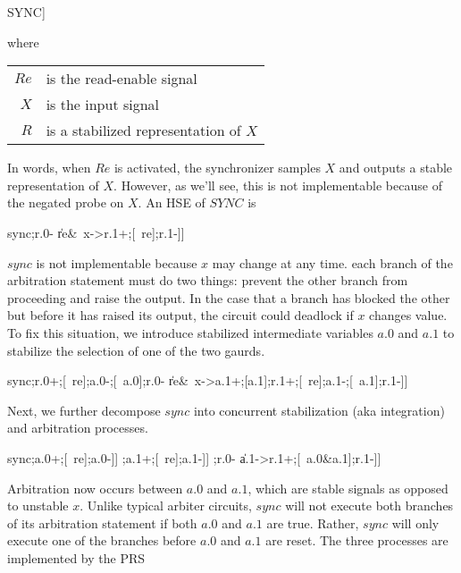 \documentclass[aer.tex]{subfiles}
\begin{document}
\begin{csp}
SYNC\equiv*[[#{Re}&#X->R;Re;R
          \|#{Re}&~#X->R;Re;R]]
\end{csp}

where

\begin{tabular}[c]{rl}
$Re$ & is the read-enable signal \\
$X$ & is the input signal \\
$R$ & is a stabilized representation of $X$ \\
\end{tabular}

In words, when $Re$ is activated, the synchronizer samples $X$ and outputs a stable representation of $X$.
However, as we'll see, this is not implementable because of the negated probe on $X$. 
An HSE of $SYNC$ is

\begin{hse}
sync\equiv*[[re&x->r.0+;[~re];r.0-
        \|re&~x->r.1+;[~re];r.1-]]
\end{hse}

$sync$ is not implementable because $x$ may change at any time.
each branch of the arbitration statement must do two things:
prevent the other branch from proceeding and raise the output. In the case that a branch
has blocked the other but before it has raised its output, the circuit could deadlock if $x$ changes value.
To fix this situation, we introduce stabilized intermediate variables $a.0$ and $a.1$ to
stabilize the selection of one of the two gaurds.

\begin{hse}
sync\equiv*[[re&x->a.0+;[a.0];r.0+;[~re];a.0-;[~a.0];r.0-
        \|re&~x->a.1+;[a.1];r.1+;[~re];a.1-;[~a.1];r.1-]]
\end{hse}

Next, we further decompose $sync$ into concurrent stabilization (aka integration) and arbitration processes.

\begin{hse}
sync\equiv*[[re&~x];a.0+;[~re];a.0-]]
     \pll*[[re&x];a.1+;[~re];a.1-]]
     \pll*[[a.0->r.0+;[~a.0&~a.1];r.0-
        \|a.1->r.1+;[~a.0&a.1];r.1-]]
\end{hse}

Arbitration now occurs between $a.0$ and $a.1$, which are stable signals as opposed to unstable $x$.
Unlike typical arbiter circuits, $sync$ will not execute both branches of its arbitration statement
if both $a.0$ and $a.1$ are true. Rather, $sync$ will only execute one of the branches before 
$a.0$ and $a.1$ are reset. The three processes are implemented by the PRS
\end{document}
